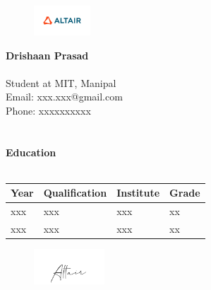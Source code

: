 \documentclass{article}
\begin{document}
	\pagestyle{empty}
	\begin{figure}
		\includegraphics[width=80px]{altair.jpg}
	\end{figure}
	\textbf{\huge{Drishaan Prasad}}\\\\
	Student at MIT, Manipal\\
	Email: xxx.xxx@gmail.com\\
	Phone: xxxxxxxxxx\\\\\\
	\textbf{\Large{Education}}\\\\
	\begin{tabular}{|p{0.5in}|p{1.5in}|p{2in}|p{0.5in}|}
		\hline
		Year & Qualification & Institute & Grade\\
		\hline
		xxx & xxx & xxx & xx\\
		\hline
		xxx & xxx & xxx & xx\\
		\hline
	\end{tabular}
	\vfill
	\begin{figure}[h!]
		\flushright
		\includegraphics[width=100px]{sign.png}
	\end{figure}
	
\end{document}
